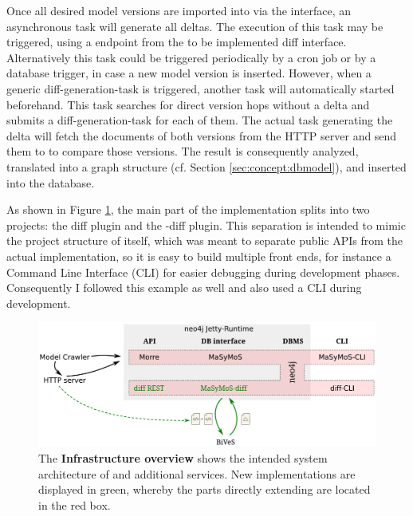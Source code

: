 Once all desired model versions are imported into \masymos via the \morre interface, an  asynchronous task will generate all deltas. The execution of this task may be triggered, using a \rest endpoint from the to be implemented diff \rest interface. Alternatively this task could be triggered periodically by a cron job or by a database trigger, in case a new model version is inserted.
However, when a generic diff-generation-task is triggered, another task will automatically started beforehand. This task searches for direct version hops without a delta and submits a diff-generation-task for each of them. 
The actual task generating the delta will fetch the \xml documents of both versions from the HTTP server and send them to \bives to compare those versions. The result is consequently analyzed, translated into a graph structure (cf. Section \ref{sec:concept:dbmodel}), and inserted into the database.

As shown in Figure \ref{fig:system-overview}, the main part of the implementation splits into two projects: the diff \rest plugin and the \masymos-diff plugin. This separation is intended to mimic the project structure of \masymos itself, which was meant to separate public APIs from the actual implementation, so it is easy to build multiple front ends, for instance a Command Line Interface (CLI) for easier debugging during development phases. Consequently I followed this example as well and also used a CLI during development.

\begin{figure}[h]
	\centering
	\includegraphics[width=\textwidth]{resources/system-overview-matrix.pdf}
	\caption[Infrastructure overview]{The \textbf{Infrastructure overview} shows the intended system architecture of \masymos \neoj and additional services. New implementations are displayed in green, whereby the parts directly extending \neoj are located in the red box.}
	\label{fig:system-overview}
\end{figure}

